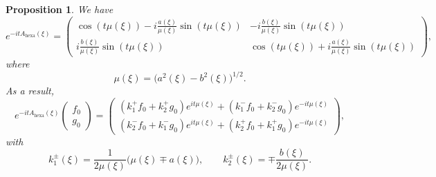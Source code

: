 \documentclass[JEP,XML,SOM,Unicode,NoFloatCountersInSection,published]{cedram}
\newtheorem{prop}[theorem]{Proposition}
\theoremstyle{definition}
\begin{document}
\begin{prop} \label{propeitA}
We have
\begin{equation}\label{expr_expo_A}
e^{-itA_{\mathrm{hexa}}(\xi)} = \begin{pmatrix} \cos(t\mu(\xi)) - i\frac{a(\xi)}{\mu(\xi)}\sin(t\mu(\xi)) & -i\frac{b(\xi)}{\mu(\xi)}\sin(t\mu(\xi)) \\[6pt] i\frac{b(\xi)}{\mu(\xi)}\sin(t\mu(\xi)) & \cos(t\mu(\xi)) + i\frac{a(\xi)}{\mu(\xi)}\sin(t\mu(\xi)) \end{pmatrix},
\end{equation}
where
\[
\mu(\xi)=\bigl(a^2(\xi)-b^2(\xi)\bigr)^{1/2}.
\]
As a result,
\begin{equation}\label{expr_sg_fg}
e^{-it A_{\mathrm{hexa}}(\xi)}\begin{pmatrix} {f}_0 \\ {g}_0 \end{pmatrix} = \begin{pmatrix} (k_1^{+}{f}_0+k_{2}^{+}{g}_0)e^{it\mu(\xi)} + (k_{1}^{-}{f}_0+k_2^{-}{g}_0)e^{-it\mu(\xi)} \\[6pt] (k_2^{-}{f}_0+k_1^{-}{g}_0)e^{it\mu(\xi)} + (k_{2}^{+}{f}_0+k_{1}^{+}{g}_0)e^{-it\mu(\xi)}\end{pmatrix},
\end{equation}
with
\begin{equation}\label{defK}
k_1^{\pm}(\xi) = \frac{1}{2\mu(\xi)}\bigl(\mu(\xi)\mp a(\xi)\bigr), \qquad k_2^{\pm}(\xi) = \mp\frac{b(\xi)}{2\mu(\xi)}.
\end{equation}
\end{prop}
\end{document}
